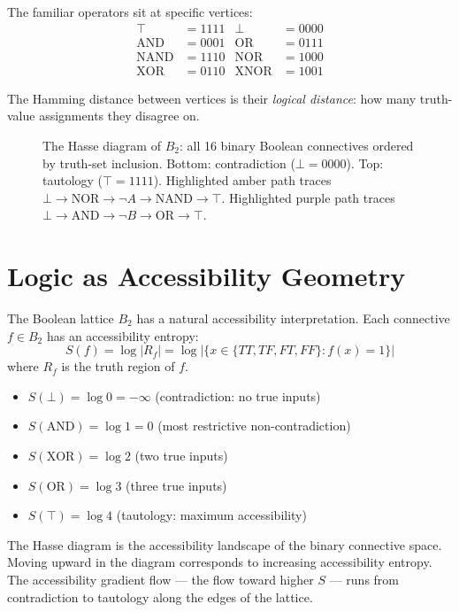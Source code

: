 The familiar operators sit at specific vertices:
\begin{align*}
  \top &= 1111 & \bot &= 0000 \\
  \mathrm{AND} &= 0001 & \mathrm{OR} &= 0111 \\
  \mathrm{NAND} &= 1110 & \mathrm{NOR} &= 1000 \\
  \mathrm{XOR} &= 0110 & \mathrm{XNOR} &= 1001
\end{align*}

The Hamming distance between vertices is their \emph{logical distance}:
how many truth-value assignments they disagree on.

\begin{figure}[ht]
  \centering
  \begin{tikzpicture}[scale=0.85]
    
  \end{tikzpicture}
  \caption{The Hasse diagram of $B_2$: all 16 binary Boolean connectives
    ordered by truth-set inclusion. Bottom: contradiction ($\bot = 0000$).
    Top: tautology ($\top = 1111$). Highlighted amber path traces
    $\bot \to \mathrm{NOR} \to \neg A \to \mathrm{NAND} \to \top$.
    Highlighted purple path traces
    $\bot \to \mathrm{AND} \to \neg B \to \mathrm{OR} \to \top$.}
  \label{fig:hasse}
\end{figure}

\section{Logic as Accessibility Geometry}

The Boolean lattice $B_2$ has a natural accessibility interpretation.
Each connective $f \in B_2$ has an accessibility entropy:
\[
  S(f) = \log|R_f| = \log|\{x \in \{TT,TF,FT,FF\} : f(x) = 1\}|
\]
where $R_f$ is the truth region of $f$.

\begin{itemize}
  \item $S(\bot) = \log 0 = -\infty$ (contradiction: no true inputs)
  \item $S(\mathrm{AND}) = \log 1 = 0$ (most restrictive non-contradiction)
  \item $S(\mathrm{XOR}) = \log 2$ (two true inputs)
  \item $S(\mathrm{OR}) = \log 3$ (three true inputs)
  \item $S(\top) = \log 4$ (tautology: maximum accessibility)
\end{itemize}

The Hasse diagram is the accessibility landscape of the binary connective
space. Moving upward in the diagram corresponds to increasing accessibility
entropy. The accessibility gradient flow — the flow toward higher $S$ —
runs from contradiction to tautology along the edges of the lattice.

